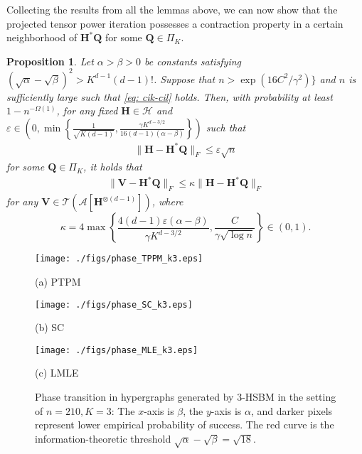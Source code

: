 \documentclass{article}
\theoremstyle{plain}
\newtheorem{proposition}[theorem]{Proposition}
\theoremstyle{definition}
\theoremstyle{remark}
\newcommand{\BH}{\bm{H}}
\newcommand{\BQ}{\bm{Q}}
\newcommand{\TCal}{\mathcal{T}}
\newcommand{\ACal}{\mathcal{A}}
\begin{document}
Collecting the results from all the lemmas above, we can now show that the projected tensor power iteration possesses a contraction property in a certain neighborhood of $\BH^* \BQ$ for some $\BQ \in \Pi_K$. 
\begin{proposition}	\label{prop: localcontraction}
	Let $\alpha > \beta >0$ be constants satisfying $(\sqrt{\alpha} - \sqrt{\beta})^2 > K^{d-1}(d-1)!$. Suppose that $n > \exp(16C^2/\gamma^2) \}$ and $n$ is sufficiently large such that \eqref{eq: cik-cil} holds.
	Then, with probability at least $1-n^{-\Omega(1)}$, for any fixed $\BH \in \mathcal{H}$ and $\varepsilon \in \left(0, \min \left\{\frac{1}{\sqrt{K(d-1)}}, \frac{\gamma K^{d-3/2}}{16(d-1)(\alpha - \beta)} \right\} \right)$ such that 
	\begin{align}
		\| \BH - \BH^* \BQ\|_F \leq \varepsilon \sqrt{n}
	\end{align}
	for some $\BQ \in \Pi_K$, it holds that
	\begin{align}
		\| \bm{V} - \BH^* \BQ \|_F \leq \kappa \|\BH - \BH^* \BQ\|_F
	\end{align}
	for any $\bm{V} \in \TCal\left( \ACal\left[\BH^{\otimes (d-1)}\right] \right)$, where $$\kappa = 4 \max \left\{\frac{4(d-1)\varepsilon (\alpha - \beta)}{\gamma K^{d-3/2}},  \frac{C}{\gamma \sqrt{\log n}} \right\} \in (0,1).$$
\end{proposition}


\begin{figure*}[t]
\centering
	\begin{minipage}[b]{0.31\linewidth}
		\centering
		\centerline{\texttt{[image: ./figs/phase\_TPPM\_k3.eps]}}
		\centerline{(a) PTPM}\medskip
	\end{minipage}
	\begin{minipage}[b]{0.31\linewidth}
		\centering
		\centerline{\texttt{[image: ./figs/phase\_SC\_k3.eps]}}
		\centerline{(b) SC}\medskip
	\end{minipage}
	\begin{minipage}[b]{0.31\linewidth}
		\centering
		\centerline{\texttt{[image: ./figs/phase\_MLE\_k3.eps]}}
		\centerline{(c) LMLE}\medskip
	\end{minipage}
	\vskip -0.2in
	\caption{Phase transition in hypergraphs generated by $3$-HSBM in the setting of $n=210, K=3$: The $x$-axis is $\beta$, the $y$-axis is $\alpha$, and darker pixels represent lower empirical probability of success. The red curve is the information-theoretic threshold $\sqrt{\alpha}-\sqrt{\beta}=\sqrt{18}$.}
	\label{fig: phase-transition}
\end{figure*}
\end{document}
